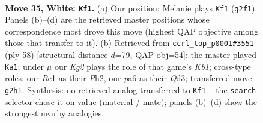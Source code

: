 \documentclass[11pt]{article}
\begin{document}
\clearpage

\begin{figure}[p]\centering
\begin{subfigure}{0.46\textwidth}\centering
\resizebox{\linewidth}{!}{%
\newchessgame
\chessboard[
  setfen={r2r3k/bp1b1Qp1/p3p2P/8/6q1/BP1p4/P4PKP/1R2R3 w - - 0 35},
  showmover=false,
  pgfstyle=straightmove, color=movearrow, markmove={g2-f1}
]}
\caption{}
\end{subfigure}\hfill
\begin{subfigure}{0.46\textwidth}\centering
\resizebox{\linewidth}{!}{%
\newchessgame
\chessboard[
  setfen={r4r1k/1p4pp/p3Rb2/3pBP2/1q6/3Q4/P1P3PP/1K1R4 w - - 7 30},
  showmover=false,
  pgfstyle=straightmove, color=movearrow, markmove={b1-a1}
]}
\caption{}
\end{subfigure}
\\[4pt]

\caption{\textbf{Move 35, White: \texttt{Kf1}.} (a) Our position; Melanie plays \texttt{Kf1} (\texttt{g2f1}). Panels (b)--(d) are the retrieved master positions whose correspondence most drove this move (highest QAP objective among those that transfer to it). (b) Retrieved from \texttt{ccrl\_top\_p0001\#3551} (ply 58) [structural distance $d$=79, QAP obj=54]: the master played \texttt{Ka1}; under $\mu$ our \emph{Kg2} plays the role of that game's \emph{Kb1}; cross-type roles: our \emph{R}e1 as their \emph{P}h2, our \emph{p}a6 as their \emph{Q}d3; transferred move \texttt{g2h1}. Synthesis: no retrieved analog transferred to \texttt{Kf1} -- the \texttt{search} selector chose it on value (material / mate); panels (b)--(d) show the strongest nearby analogies.}
\label{fig:thought-m68}
\end{figure}

\clearpage
\end{document}
